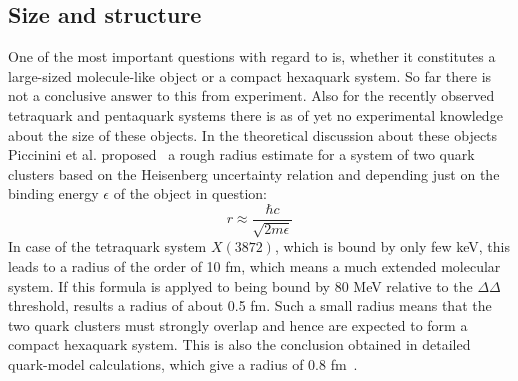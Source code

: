%
\subsection{Size and structure}

One of the most important questions with regard to \dst is, whether it constitutes a large-sized
molecule-like object or a compact hexaquark system.
So far there is not a conclusive answer to this from experiment.
Also for the recently observed tetraquark and pentaquark systems there is as of yet no experimental
knowledge about the size of these objects.
In the theoretical discussion about these objects Piccinini et al. proposed~\cite{picci} a rough radius 
estimate for a system of two quark clusters based on the Heisenberg uncertainty relation and depending
just on the binding energy $\epsilon$ of the object in question:
\begin{equation}
    r \approx \frac{\hbar c}{\sqrt{2 m \epsilon}}
\end{equation}
In case of the tetraquark system $X(3872)$, which is bound by only few keV, this leads to a radius of 
the order of 10 fm, which means a much extended molecular system. 
If this formula is applyed to \dst being bound by 80 MeV relative to the $\Delta\Delta$ threshold,
results a radius of about 0.5 fm.
Such a small radius means that the two quark clusters must strongly overlap and hence are expected
to form a compact hexaquark system.
This is also the conclusion obtained in detailed quark-model calculations, which give a radius of
0.8 fm~\cite{size1,size2}.